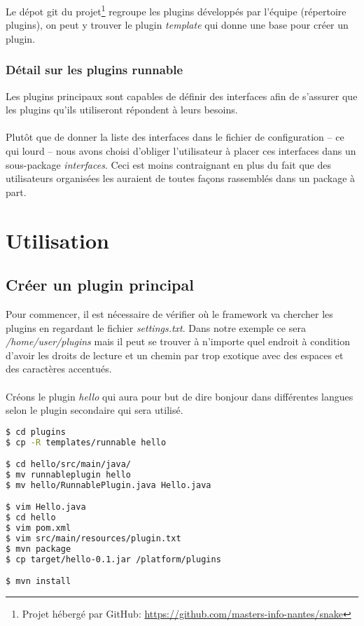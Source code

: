 \documentclass[12pt,a4paper]{article}
\begin{document}
Le dépot git du projet\footnote{Projet hébergé par GitHub: 
\href{github.com/masters-info-nantes/snake}
{https://github.com/masters-info-nantes/snake}} regroupe les plugins développés 
par l'équipe (répertoire plugins), on peut y trouver le plugin \emph{template} qui 
donne une base pour créer un plugin.

\subsubsection{Détail sur les plugins runnable}\label{sss:DetailsRunnable}
Les plugins principaux sont capables de définir des interfaces afin de s'assurer 
que les plugins qu'ils utiliseront répondent à leurs besoins.
\\\\
Plutôt que de donner la liste des interfaces dans le fichier de configuration -- 
ce qui lourd -- nous avons choisi d'obliger l'utilisateur à placer ces interfaces 
dans un sous-package \emph{interfaces}. Ceci est moins contraignant en plus du 
fait que des utilisateurs organisées les auraient de toutes façons rassemblés 
dans un package à part.

\section{Utilisation}
\subsection{Créer un plugin principal}
Pour commencer, il est nécessaire de vérifier où le framework va chercher les 
plugins en regardant le fichier \emph{settings.txt}. Dans notre exemple ce sera 
\emph{/home/user/plugins} mais il peut se trouver à n'importe quel endroit à 
condition d'avoir les droits de lecture et un chemin par trop exotique avec des 
espaces et des caractères accentués.
\\\\
Créons le plugin \emph{hello} qui aura pour but de dire bonjour dans différentes 
langues selon le plugin secondaire qui sera utilisé.

\begin{lstlisting}[language=bash,caption=Création du plugin hello]
$ cd plugins
$ cp -R templates/runnable hello

$ cd hello/src/main/java/
$ mv runnableplugin hello
$ mv hello/RunnablePlugin.java Hello.java

$ vim Hello.java
$ cd hello
$ vim pom.xml
$ vim src/main/resources/plugin.txt
$ mvn package
$ cp target/hello-0.1.jar /platform/plugins

$ mvn install
\end{lstlisting}
\end{document}
